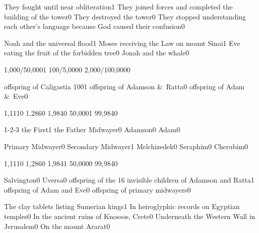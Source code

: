 {They fought until near obliteration}{1}
{They joined forces and completed the building of the tower}{0}
{They destroyed the tower}{0}
{They stopped understanding each other's language because God caused their confusion}{0}
\qstop

{Noah and the universal flood}{1}
{Moses receiving the Law on mount Sinai}{1}
{Eve eating the fruit of the forbidden tree}{0}
{Jonah and the whale}{0}
\qstop

{1,000/50,000}{1}
{100/5,000}{0}
{2,000/100,000}{0}
\qstop

{offspring of Caligastia 100}{1}
{offspring of Adamson \&\ Ratta}{0}
{offspring of Adam \&\ Eve}{0}
\qstop

{1,111}{0}
{1,286}{0}
{1,984}{0}
{50,000}{1}
{99,984}{0}
\qstop

{1-2-3 the First}{1}
{the Father Midwayer}{0}
{Adamson}{0}
{Adam}{0}
\qstop

{Primary Midwayer}{0}
{Secondary Midwayer}{1}
{Melchizedek}{0}
{Seraphim}{0}
{Cherubim}{0}
\qstop

{1,111}{0}
{1,286}{0}
{1,984}{1}
{50,000}{0}
{99,984}{0}
\qstop

{Salvington}{0}
{Uversa}{0}
{offspring of the 16 invisible children of Adamson and Ratta}{1}
{offspring of Adam and Eve}{0}
{offspring of primary midwayers}{0}
\qstop

{The clay tablets listing Sumerian kings}{1}
{In heiroglyphic records on Egyptian temples}{0}
{In the ancient ruins of Knossos, Crete}{0}
{Underneath the Western Wall in Jerusalem}{0}
{On the mount Ararat}{0}
\qstop

